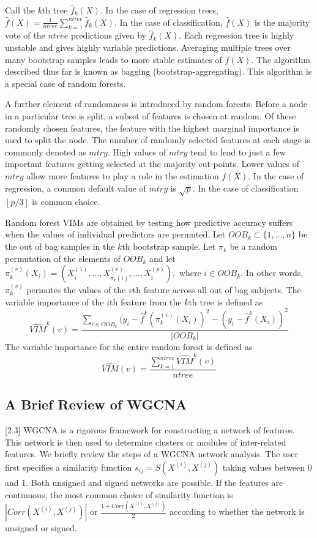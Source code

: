 \documentclass[article,shortnames]{jss}
\begin{document}
Call the $k$th tree $\hat{f}_{k}(X)$.  In the case of regression trees,
$\hat{f}(X)=\frac{1}{ntree}\sum_{k=1}^{ntree}\hat{f}_{k}(X)$.  In the case of classification, $\hat{f}(X)$ is the majority vote of the $ntree$ predictions given
by $\hat{f}_{k}(X)$.  Each regression tree is highly unstable and gives highly variable predictions.  Averaging multiple trees over
many bootstrap samples leads to more stable estimates of $f(X)$.  The algorithm described thus far is known as bagging (bootstrap-aggregating).  This 
algorithm is a special case of random forests.  

A further element of randomness is introduced by random forests.  Before a node in a particular tree is split, a subset of features is chosen at random.  Of these randomly 
chosen features, the feature with the highest marginal importance is used to split the node.  The number of randomly selected features at each stage is
commonly denoted as $mtry$.  High values of $mtry$ tend to lead to just a few important features getting selected at the majority cut-points.
Lower values of $mtry$ allow more features to play a role in the estimation $f(X)$.  In the case of regression, a common default value of $mtry$ is $\sqrt{p}$.
In the case of classification  $\left\lfloor p/3 \right\rfloor$ is common choice.
  
Random forest VIMs are obtained by testing how predictive accuracy suffers when the values of individual predictors are permuted.  Let $OOB_{k} \subset \{1,\ldots, n\}$ 
be the out of bag samples in the $k$th bootstrap sample.  Let $\pi_{k}$ be a random permutation of the elements of $OOB_{k}$ and let   
$\pi_{k}^{(v)}(X_{i}) = (X_{i}^{(1)},\ldots,X_{\pi_{k}(i)}^{(v)},\ldots,X_{i}^{(p)}),$ where $i \in OOB_{k}$.   In other words, $\pi_{k}^{(v)}$ 
permutes the values of the $v$th feature across all out of bag subjects.  The variable importance of the $i$th feature from the $k$th tree is defined as
\begin{equation}
\widehat{VIM}^{k}(v)= \frac{\sum_{i \in OOB_{k}}(y_{i}-\hat{f}^{k}(\pi_{k}^{(v)}(X_{i}))^{2} - (y_{i} - \hat{f}^{k}(X_{i}))^{2}}{|OOB_{k}|}
\end{equation}
The variable importance for the entire random forest is defined as
\begin{equation}
\widehat{VIM}(v) = \frac{\sum_{k=1}^{ntree}\widehat{VIM}^{k}(v)}{ntree}
\end{equation}

\subsection{A Brief Review of WGCNA}[2.3]
WGCNA is a rigorous framework for constructing a network of features. 
This network is then used to determine clusters or modules of inter-related features. 
We briefly review the steps of a WGCNA network analysis.  The user first specifies a similarity function $s_{ij}=S(X^{(i)},X^{(j)})$ taking
values between 0 and 1.  Both unsigned and signed networks are possible.  If the features are continuous, the most common choice 
of similarity function is $|Corr(X^{(i)},X^{(j)})|$ or $\frac{1 + Corr(X^{(i)},X^{(j)})}{2}$  according to whether the network is unsigned or 
signed.
\end{document}
